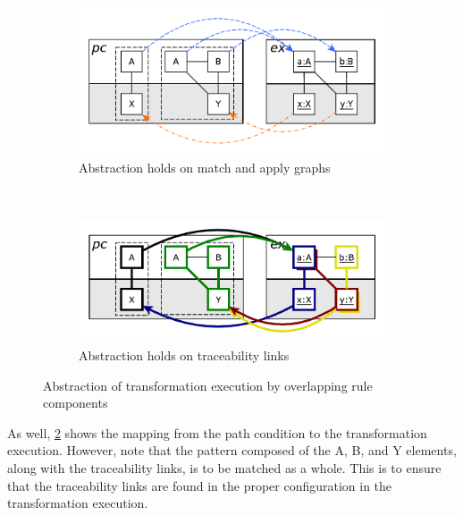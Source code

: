 \begin{figure}[htb]
        \centering
        \begin{subfigure}[b]{0.40\textwidth}
                \centering
                \includegraphics[width=1\textwidth]{./figures/abstraction_relation/overlapping.pdf}
               	\caption{Abstraction holds on match and apply graphs}
               	\label{fig:overlapping_match_apply}
        \end{subfigure}%
        ~~\\
        \begin{subfigure}[b]{0.40\textwidth}
                \centering
                \includegraphics[width=1\textwidth]{./figures/abstraction_relation/overlapping_trace_links.pdf}
                \caption{Abstraction holds on traceability links}
                \label{fig:overlapping_trace_links}
        \end{subfigure}%
        \caption{Abstraction of transformation execution by overlapping rule components}
        \label{fig:overlapping}
\end{figure}

As well, \cref{fig:overlapping_trace_links} shows the mapping from the path condition to the transformation execution. However, note that the pattern composed of the A, B, and Y elements, along with the traceability links, is to be matched as a whole. This is to ensure that the traceability links are found in the proper configuration in the transformation execution.

